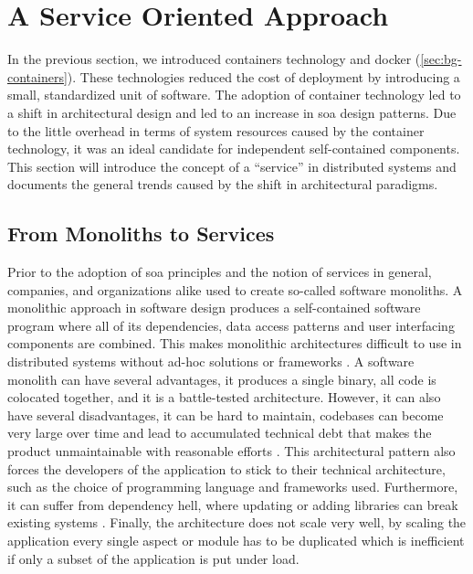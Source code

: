 \section{A Service Oriented Approach}
\label{sec:background:soa}

In the previous section, we introduced \glspl{container} technology and \Gls{docker} (\cref{sec:bg-containers}). These technologies reduced the cost of deployment by introducing a small, standardized unit of software. The adoption of container technology led to a shift in architectural design and led to an increase in \gls{soa} design patterns. Due to the little overhead in terms of system resources caused by the \gls{container} technology, it was an ideal candidate for independent self-contained components. This section will introduce the concept of a “service” in distributed systems and documents the general trends caused by the shift in architectural paradigms.

\subsection{From Monoliths to Services}
Prior to the adoption of \gls{soa} principles and the notion of services in general, companies, and organizations alike used to create so-called software \glspl{monolith}. A monolithic approach in software design produces a self-contained software program where all of its dependencies, data access patterns and user interfacing components are combined. This makes monolithic architectures difficult to use in distributed systems without ad-hoc solutions or frameworks \cite{dragoni2017microservices}. A software \gls{monolith} can have several advantages, it produces a single binary, all code is colocated together,  and it is a battle-tested architecture. However, it can also have several disadvantages, it can be hard to maintain, codebases can become very large over time and lead to accumulated technical debt that makes the product unmaintainable with reasonable efforts \cite{fritzsch2018monolith}. This architectural pattern also forces the developers of the application to stick to their technical architecture, such as the choice of programming language and frameworks used. Furthermore, it can suffer from dependency hell, where updating or adding libraries can break existing systems  \cite{merkel2014docker}. Finally, the architecture does not scale very well, by scaling the application every single aspect or module has to be duplicated which is inefficient if only a subset of the application is put under load.


